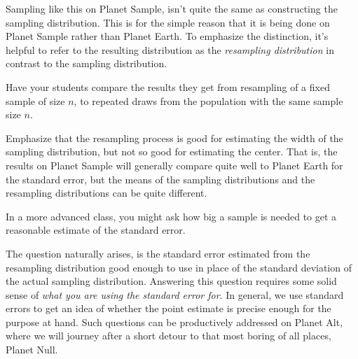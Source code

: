 \begin{center}
\begin{knitrout}
\end{knitrout}

\end{center}
Sampling like this on Planet Sample, isn't quite the same as constructing 
the sampling distribution.  This is for the simple reason that it is being
done on Planet Sample rather than Planet Earth.  To emphasize the
distinction, it's helpful to refer to the resulting distribution as the 
{\em resampling distribution} in contrast to the sampling distribution.

\begin{example}
Have your students compare the results they get from resampling of a
fixed sample of size $n$, to repeated draws from the population with
the same sample size $n$.

Emphasize that the resampling process is good for estimating the width
of the sampling distribution, but not so good for estimating the
center.  That is, the results on Planet Sample will generally compare
quite well to Planet Earth for the standard error, but the means of
the sampling distributions and the resampling distributions can be
quite different.

In a more advanced class, you might ask how big a sample is needed to
get a reasonable estimate of the standard error.
\end{example}

The question naturally arises, is the standard error estimated from the
resampling distribution good enough to use in place of the standard deviation
of the actual sampling distribution.  Answering this question requires some
solid sense of {\em what you are using the standard error for}.    In general,
we use standard errors to get an idea of whether the point estimate is precise
enough for the purpose at hand.  Such questions can be productively addressed
on Planet Alt, where we will journey after a short detour to that most boring
of all places, Planet Null.

